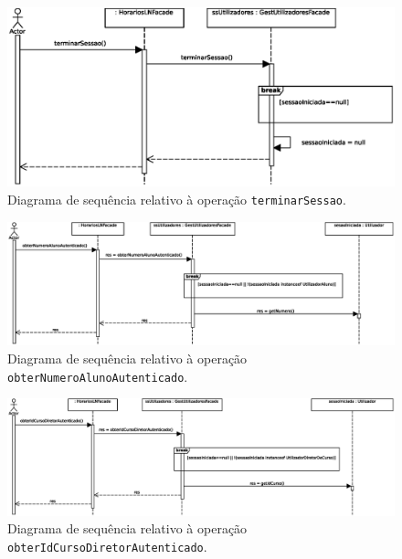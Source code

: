 \documentclass[12pt, a4paper]{article}
\begin{document}
\begin{landscape}
        \vspace*{\fill}
        \pagebreak
        \vspace*{\fill}

        \begin{figure}[H]
            \centering
            \includegraphics[width=\textwidth]{Imagens/Modelos/terminarSessao.svg.eps}
            \caption{
                Diagrama de sequência relativo à operação \texttt{terminarSessao}.
            }
        \end{figure}

        \vspace*{\fill}
        \pagebreak
        \vspace*{\fill}

        \begin{figure}[H]
            \centering
            \includegraphics[width=\textwidth]{Imagens/Modelos/obterNumeroAlunoAutenticado.svg.eps}
            \caption{
                Diagrama de sequência relativo à operação \texttt{obterNumeroAlunoAutenticado}.
            }
        \end{figure}

        \begin{figure}[H]
            \centering
            \includegraphics[width=\textwidth]{Imagens/Modelos/obterIdCursoDiretorAutenticado.svg.eps}
            \caption{
                Diagrama de sequência relativo à operação \texttt{obterIdCursoDiretorAutenticado}.
            }
        \end{figure}


\end{landscape}
\end{document}

